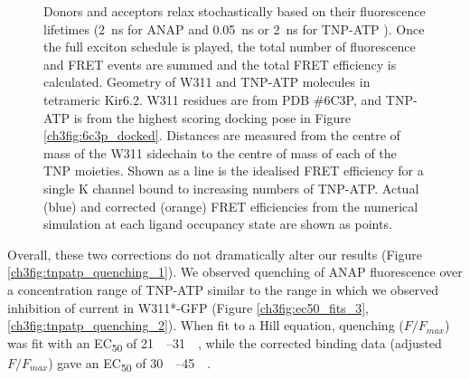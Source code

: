 \begin{figure}[h]
{	Donors and acceptors relax stochastically based on their fluorescence lifetimes (\SI{2}{\nano\second} for ANAP \cite{zagotta_measuring_2016-1} and \SI{0.05}{\nano\second} or \SI{2}{\nano\second} for TNP-ATP \cite{ye_spectroscopic_1999, ishikawa_single-molecule_2002}).
	Once the full exciton schedule is played, the total number of fluorescence and FRET events are summed and the total FRET efficiency is calculated.
	 Geometry of W311 and TNP-ATP molecules in tetrameric Kir6.2.
	W311 residues are from PDB \#6C3P, and TNP-ATP is from the highest scoring docking pose in Figure \ref{ch3fig:6c3p_docked}.
	Distances are measured from the centre of mass of the W311 sidechain to the centre of mass of each of the TNP moieties.
	 Shown as a line is the idealised FRET efficiency for a single K\ATP{} channel bound to increasing numbers of TNP-ATP.
	Actual (blue) and corrected (orange) FRET efficiencies from the numerical simulation at each ligand occupancy state are shown as points.
	}
\end{figure}

Overall, these two corrections do not dramatically alter our results (Figure \ref{ch3fig:tnpatp_quenching_1}).
We observed quenching of ANAP fluorescence over a concentration range of TNP-ATP similar to the range in which we observed inhibition of current in W311*-GFP (Figure \ref{ch3fig:ec50_fits_3}, \ref{ch3fig:tnpatp_quenching_2}).
When fit to a Hill equation, quenching ($F/F_{max}$) was fit with an EC\textsubscript{50} of \SIrange{21}{31}{\micro\Molar}, while the corrected binding data (adjusted $F/F_{max}$) gave an EC\textsubscript{50} of \SIrange{30}{45}{\micro\Molar}.

